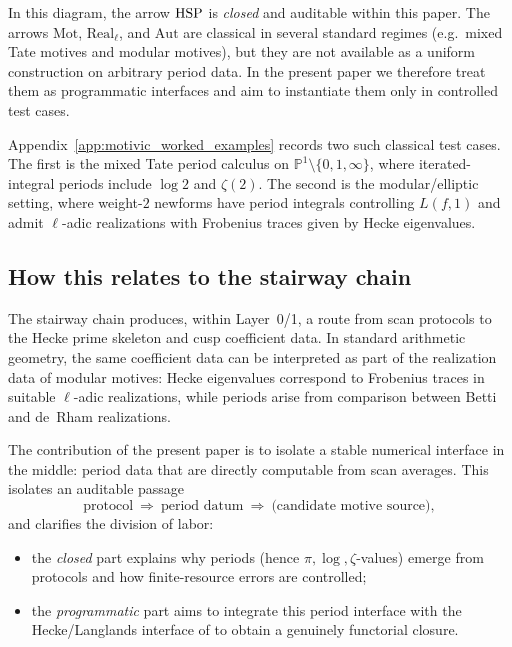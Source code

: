 In this diagram, the arrow $\mathrm{HSP}$ is \emph{closed} and auditable within this paper. The arrows $\mathrm{Mot}$, $\mathrm{Real}_\ell$, and $\mathrm{Aut}$ are classical in several standard regimes (e.g.\ mixed Tate motives and modular motives), but they are not available as a uniform construction on arbitrary period data. In the present paper we therefore treat them as programmatic interfaces and aim to instantiate them only in controlled test cases.

Appendix~\ref{app:motivic_worked_examples} records two such classical test cases. The first is the mixed Tate period calculus on $\mathbb{P}^1\setminus\{0,1,\infty\}$, where iterated-integral periods include $\log 2$ and $\zeta(2)$. The second is the modular/elliptic setting, where weight-$2$ newforms have period integrals controlling $L(f,1)$ and admit $\ell$-adic realizations with Frobenius traces given by Hecke eigenvalues.

\subsection{How this relates to the stairway chain}
\label{sec:relation_to_stairway_chain}

The stairway chain \cite{Ma2025STI} produces, within Layer~0/1, a route from scan protocols to the Hecke prime skeleton and cusp coefficient data. In standard arithmetic geometry, the same coefficient data can be interpreted as part of the realization data of modular motives: Hecke eigenvalues correspond to Frobenius traces in suitable $\ell$-adic realizations, while periods arise from comparison between Betti and de~Rham realizations.

The contribution of the present paper is to isolate a stable numerical interface in the middle: period data that are directly computable from scan averages. This isolates an auditable passage
\[
\text{protocol}\ \Rightarrow\ \text{period datum}\ \Rightarrow\ \text{(candidate motive source)},
\]
and clarifies the division of labor:
\begin{itemize}
\item the \emph{closed} part explains why periods (hence $\pi,\log,\zeta$-values) emerge from protocols and how finite-resource errors are controlled;
\item the \emph{programmatic} part aims to integrate this period interface with the Hecke/Langlands interface of \cite{Ma2025STI} to obtain a genuinely functorial closure.
\end{itemize}

